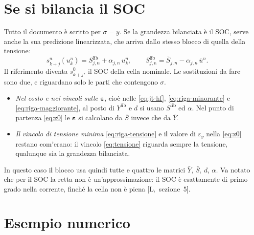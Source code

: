 \documentclass[11pt,a4paper]{article}
\newcommand{\vett}[1]{\boldsymbol{#1}}      %
\newcommand{\lib}{\mathrm{lib}}             %
\begin{document}
\section{Se si bilancia il SOC}\label{sec:soc}

Tutto il documento è scritto per $\sigma = y$. Se la grandezza bilanciata è il
SOC, serve anche la sua predizione linearizzata, che arriva dallo stesso
blocco di quella della tensione:
\[
  s^n_{k+j}(u^n_k) = S^\lib_{j,n} + \alpha_{j,n}\,u^n_k ,
  \qquad
  S^\lib_{j,n} = \bar S_{j,n} - \alpha_{j,n}\,\bar u^n .
\]
Il riferimento diventa $s^0_{k+j}$, il SOC della cella nominale. Le sostituzioni da
fare sono due, e riguardano solo le parti che contengono $\sigma$.
\begin{itemize}
  \item \emph{Nel costo e nei vincoli sulle $\vett{\varepsilon}$}, cioè nelle
        \eqref{eq:jt-hf}, \eqref{eq:riga-minorante} e
        \eqref{eq:riga-maggiorante}, al posto di $Y^\lib$ e $d$ si usano $S^\lib$ ed
        $\alpha$. Nel punto di partenza \eqref{eq:z0} le $\vett{\varepsilon}$ si calcolano
        da $\bar S$ invece che da $\bar Y$.
  \item \emph{Il vincolo di tensione minima} \eqref{eq:riga-tensione} e il
        valore di $\varepsilon_y$ nella \eqref{eq:z0} restano com'erano: il vincolo
        \eqref{eq:tensione} riguarda sempre la tensione, qualunque sia la
        grandezza bilanciata.
\end{itemize}
In questo caso il blocco usa quindi tutte e quattro le matrici $\bar Y$,
$\bar S$, $d$, $\alpha$. Va notato che per il SOC la retta non è
un'approssimazione: il SOC è esattamente di primo grado nella corrente, finché
la cella non è piena [L,~sezione~5].

\section{Esempio numerico}\label{sec:esempio}
\end{document}
